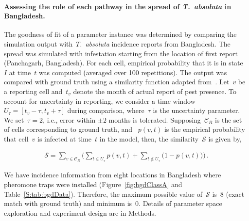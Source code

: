 \documentclass[11pt]{article}
\newcommand{\tuta}{\emph{T.~absoluta}}
\newcommand{\reportingCells}{\mathcal{C}_R}
\newcommand{\similarity}{\mathcal{S}}
\theoremstyle{definition}
\begin{document}
\paragraph{Assessing the role of each pathway in the spread of \tuta{} in
Bangladesh.} The goodness of fit of a parameter instance was determined by
comparing the
simulation output with \tuta{} incidence reports from Bangladesh. The spread was simulated with infestation starting from
the location of first report (Panchagarh, Bangladesh).
For each cell, empirical probability that it is in state~$I$ at time~$t$
was computed (averaged over 100 repetitions). The output was compared with ground truth using a similarity
function adapted from~\cite{carrasco2010unveiling}.  Let~$v$ be a
reporting cell and~$t_v$ denote the month of actual report of pest
presence.  To account for uncertainty in reporting, we consider a time
window~$U_\tau=[t_v-\tau,t_v+\tau]$ during comparison, where~$\tau$ is the
uncertainty parameter. We set~$\tau=2$, i.e., error within $\pm2$ months is
tolerated.  Supposing~$\reportingCells$ is the set of cells corresponding
to ground truth,  and ~$p(v,t)$ is the empirical probability that cell~$v$ is
infected at time~$t$ in the model, then, the
similarity~$\similarity$ is given by,
\begin{linenomath}
\begin{align}\label{eqn:similarity}
    \similarity=\sum_{v\in\reportingCells} \Big(\sum_{t\in U_\tau}p(v,t)
    + \sum_{t\notin U_\tau}\big(1-p(v,t)\big) \Big)\,.
\end{align}
\end{linenomath}
We have incidence information from eight locations in Bangladesh where
pheromone traps were installed (Figure~\ref{fig:bgdClassA} and
Table~\ref{S:tab:bgdData}).  Therefore, the maximum possible value
of~$\similarity$ is~$8$ (exact match with ground truth) and minimum is~$0$.
Details of parameter space exploration and experiment design are in
Methods.
\end{document}

